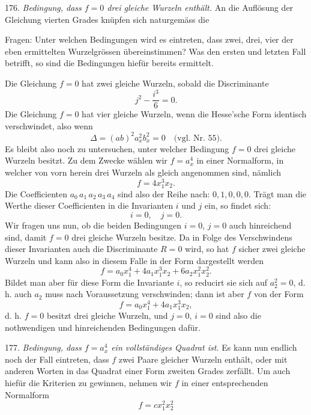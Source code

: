 \documentclass[11pt]{article}
\providecommand{\weberpage}[1]{}
\let\Delta\varDelta
\begin{document}
176. \textit{Bedingung, dass $f=0$ drei gleiche Wurzeln enthält.} An die Auflösung der Gleichung vierten Grades knüpfen sich naturgemäss die


\weberpage{196}
Fragen: Unter welchen Bedingungen wird es eintreten, dass zwei, drei, vier der eben ermittelten Wurzelgrössen übereinstimmen? Was den ersten und letzten Fall betrifft, so sind die Bedingungen hiefür bereits ermittelt.

Die Gleichung $f=0$ hat zwei gleiche Wurzeln, sobald die Discriminante
\[
j^2 - \frac{i^3}{6} = 0.
\]
Die Gleichung $f=0$ hat vier gleiche Wurzeln, wenn die Hesse'sche Form identisch verschwindet, also wenn
\[
\Delta = (ab)^2 a_x^2 b_x^2 = 0 \quad \text{(vgl. Nr. 55)}.
\]
Es bleibt also noch zu untersuchen, unter welcher Bedingung $f=0$ drei gleiche Wurzeln besitzt. Zu dem Zwecke wählen wir $f=a_x^4$ in einer Normalform, in welcher von vorn herein drei Wurzeln als gleich angenommen sind, nämlich
\[
f = 4x_1^3 x_2.
\]
Die Coefficienten $a_0\, a_1\, a_2\, a_3\, a_4$ sind also der Reihe nach: $0, 1, 0, 0, 0$. Trägt man die Werthe dieser Coefficienten in die Invarianten $i$ und $j$ ein, so findet sich:
\[
i = 0,\quad j = 0.
\]
Wir fragen uns nun, ob die beiden Bedingungen $i=0$, $j=0$ auch hinreichend sind, damit $f=0$ drei gleiche Wurzeln besitze. Da in Folge des Verschwindens dieser Invarianten auch die Discriminante $R=0$ wird, so hat $f$ sicher zwei gleiche Wurzeln und kann also in diesem Falle in der Form dargestellt werden
\[
f = a_0x_1^4 + 4a_1x_1^3x_2 + 6a_2x_1^2x_2^2.
\]
Bildet man aber für diese Form die Invariante $i$, so reducirt sie sich auf $a_2^2=0$, d. h. auch $a_2$ muss nach Voraussetzung verschwinden; dann ist aber $f$ von der Form
\[
f = a_0x_1^4 + 4a_1x_1^3x_2,
\]
d. h. $f=0$ besitzt drei gleiche Wurzeln, und $j=0$, $i=0$ sind also die nothwendigen und hinreichenden Bedingungen dafür.

177. \textit{Bedingung, dass $f=a_x^4$ ein vollständiges Quadrat ist.} Es kann nun endlich noch der Fall eintreten, dass $f$ zwei Paare gleicher Wurzeln enthält, oder mit anderen Worten in das Quadrat einer Form zweiten Grades zerfällt. Um auch hiefür die Kriterien zu gewinnen, nehmen wir $f$ in einer entsprechenden Normalform
\[
f = cx_1^2 x_2^2
\]
\end{document}

